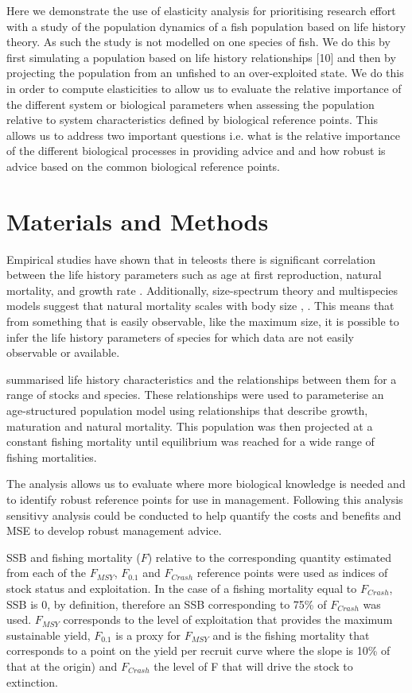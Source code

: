 \documentclass{pnastwo}
\begin{document}
\begin{article}
Here we demonstrate the use of elasticity analysis for prioritising research eﬀort with a study of the population dynamics of a ﬁsh population based on life history theory. As such the study is not modelled on one species of ﬁsh. We do this by ﬁrst simulating a population based on life history relationships [10] and then by projecting the population from an unﬁshed to an over-exploited state. We do this in order to compute elasticities to allow us to evaluate the relative importance of the diﬀerent system or biological parameters when assessing the population relative to system characteristics deﬁned by biological reference points. This allows us to address two important questions i.e. what is the relative importance of the diﬀerent biological processes in providing advice and and how robust is advice based on the common biological reference points. 

\section*{Materials and Methods}

Empirical studies have shown that in teleosts there is significant correlation between the life history parameters  
such as age at first reproduction, natural mortality, and growth rate \cite{roff1984evolution}. Additionally, size-spectrum theory 
and multispecies models suggest that natural mortality scales with body size \cite{andersen2006asymptotic}, 
\cite{pope2006modelling} \cite{gislason2008coexistence}. This means that from something that is easily observable, like the maximum size,
it is possible to infer the life history parameters of species for which data are not easily observable or available.

\cite{gislason2008coexistence} summarised life history characteristics and the relationships between them for a range of stocks and species. 
These relationships were used to parameterise an age-structured population model using relationships that describe growth, maturation and natural mortality.
This population was then projected at a constant fishing mortality until equilibrium was reached for a wide range of fishing mortalities.

The analysis allows us to evaluate where more biological knowledge is needed and to identify robust reference points for use in management. Following this analysis
sensitivy analysis could be conducted to help quantify the costs and benefits and MSE to develop robust management advice.

SSB and fishing mortality ($F$) relative to the corresponding quantity estimated from each of the $F_{MSY}$, $F_{0.1}$ and $F_{Crash}$ reference points were used 
as indices of stock status and exploitation. In the case of a fishing mortality equal to $F_{Crash}$, SSB is 0, by definition, therefore an SSB corresponding to
75\% of $F_{Crash}$ was used.  $F_{MSY}$ corresponds to the level of exploitation that provides the maximum 
sustainable yield,  $F_{0.1}$ is a proxy for $F_{MSY}$ and is the fishing mortality that corresponds to a point on the yield per recruit curve where the slope is 
10\% of that at the origin) and  $F_{Crash}$ the level of F that will drive the stock to extinction. 


\end{article}
\end{document}
